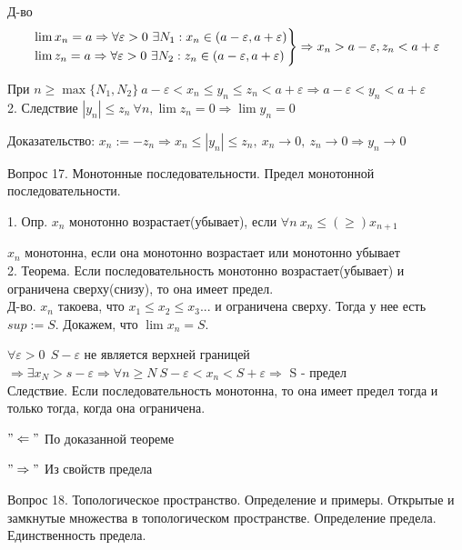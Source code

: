 \documentclass[12pt]{article}
\begin{document}
Д-во
\[
\begin{drcases}
\lim x_n = a \Rightarrow \forall \varepsilon>0\ \exists N_1: x_n\in (a-\varepsilon, a+\varepsilon)\\
\lim z_n = a \Rightarrow \forall \varepsilon>0\  \exists N_2: z_n\in (a-\varepsilon, a+\varepsilon)
\end{drcases}
\Rightarrow x_n > a-\varepsilon, z_n<a+\varepsilon 
\]

При $n\geq \max\{N_1, N_2\}\ a-\varepsilon<x_n\leq y_n \leq z_n<a+\varepsilon \Rightarrow a-\varepsilon<y_n<a+\varepsilon$\\

2. Следствие $|y_n|\leq z_n\ \forall n, \lim z_n = 0 \Rightarrow \lim y_n = 0$

Доказательство: $x_n:=-z_n \Rightarrow x_n \leq |y_n| \leq z_n,\ x_n \to 0,\ z_n \to 0 \Rightarrow y_n \to 0$
\newpage

\begin{center}
Вопрос 17. Монотонные последовательности. Предел монотонной последовательности.
\end{center}

1. Опр. $x_n$ монотонно возрастает(убывает), если $\forall n\ x_n\leq(\geq ) x_{n+1}$

$x_n$ монотонна, если она монотонно возрастает или монотонно убывает\\

2. Теорема. Если последовательность монотонно возрастает(убывает) и ограничена сверху(снизу), то она имеет предел.\\

Д-во. $x_n$ такоева, что $x_1\leq x_2\leq x_3...$ и ограничена сверху. Тогда у нее есть $sup:=S$. Докажем, что $\lim x_n = S$.

$\forall \varepsilon>0\ \ S-\varepsilon$ не является верхней границей $\Rightarrow \exists x_N>s-\varepsilon \Rightarrow \forall n\geq N\ S-\varepsilon < x_n < S+\varepsilon \Rightarrow$ S - предел\\

Следствие. Если последовательность монотонна, то она имеет предел тогда и только тогда, когда она ограничена.

$"\Leftarrow"$ По доказанной теореме

$"\Rightarrow"$ Из свойств предела
\newpage

\begin{center}
Вопрос 18. Топологическое пространство. Определение и примеры. Открытые и замкнутые множества в топологическом пространстве. Определение предела. Единственность предела.
\end{center}
\end{document}
